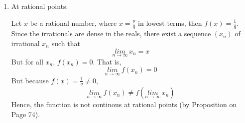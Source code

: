 \documentclass[12pt]{article}
\begin{document}
\begin{solution}
\begin{enumerate}
\begin{enumerate}
            Assume for the sake of contradiction that $q_n$ does not tend to infinity, as $x_n$ tends to $x$. That is suppose, $1 \leq q_n \leq N$ for some $N$.  Then, by definition of limits, for every $\epsilon$, there exist some $M$ such that $n > M, \, d(x_n, x) < \epsilon$. That is, 
            \[ x_n = \frac{p_n}{q_n} \in (x-\epsilon, x + \epsilon)\]
            Which is, 
            \begin{align*}
                x - \epsilon &< \frac{p_n}{q_n} <  x+ \epsilon \\ 
                q_n(x - \epsilon) &< p_n <  q_n(x+ \epsilon) \\ 
            \end{align*}
            Since the interval is bounded, there are only a finite number of integer values $p_n$ can have, and we already know that there are only a finite number of denominators that $x_n$ since $q_n$ is bounded by $N$ by assumption. Since there are finitely many possible rational numbers in the interval $(x-\epsilon, x + \epsilon)$ and infinitely many terms of the sequence lie in that interval, by the pigeonhole principle, at least one rational number must occur infinitely often. Hence a subsequence converges to that rational number. But limits are unique, and by assumption the limit $x$ is irrational. Hence a contradiction! That is, $q_n \to \infty$ as $x_n \to x$. 
            
            Note that  as $x_n \to x$, \[q_n \to \infty \implies f(x_n) = \frac{1}{q_n} \to 0\]
        \end{enumerate}
        Either ways, $f(x_n) \to 0 = f(x)$, therefore $f$ is continous at every irrational point. 
        
        \item At rational points. 
        
        Let $x$ be a rational number, where $x = \frac{p}{q}$ in lowest terms, then $f(x) = \frac{1}{q}$. Since the irrationals are dense in the reals, there exist a sequence $(x_n)$ of irrational $x_n$ such that 
        \[\underset{n\to \infty}{lim} \, x_n = x\] 
        But for all $x_n$, $f(x_n) = 0$. That is, 
        \[\underset{n\to \infty}{lim} \, f(x_n) = 0\]
        But because $f(x) = \frac{1}{q} \neq 0$, 
        \[\underset{n\to \infty}{lim} \, f(x_n) \neq  f(\underset{n\to \infty}{lim} \, x_n)\] 
        Hence, the function is not continous at rational points (by Proposition on Page 74). 
    \end{enumerate}
\end{solution}
\end{document}
